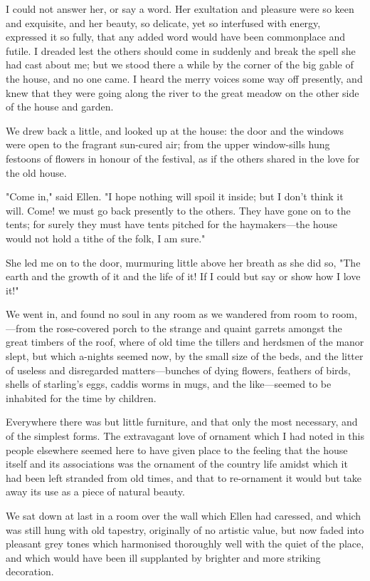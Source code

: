 I could not answer her, or say a word. Her exultation and pleasure were
so keen and exquisite, and her beauty, so delicate, yet so interfused
with energy, expressed it so fully, that any added word would have been
commonplace and futile. I dreaded lest the others should come in
suddenly and break the spell she had cast about me; but we stood there a
while by the corner of the big gable of the house, and no one came. I
heard the merry voices some way off presently, and knew that they were
going along the river to the great meadow on the other side of the house
and garden.

We drew back a little, and looked up at the house: the door and the
windows were open to the fragrant sun-cured air; from the upper
window-sills hung festoons of flowers in honour of the festival, as if
the others shared in the love for the old house.

"Come in," said Ellen. "I hope nothing will spoil it inside; but I don't
think it will. Come! we must go back presently to the others. They have
gone on to the tents; for surely they must have tents pitched for the
haymakers---the house would not hold a tithe of the folk, I am sure."

She led me on to the door, murmuring little above her breath as she did
so, "The earth and the growth of it and the life of it! If I could but
say or show how I love it!"

We went in, and found no soul in any room as we wandered from room to
room,---from the rose-covered porch to the strange and quaint garrets
amongst the great timbers of the roof, where of old time the tillers and
herdsmen of the manor slept, but which a-nights seemed now, by the small
size of the beds, and the litter of useless and disregarded
matters---bunches of dying flowers, feathers of birds, shells of
starling's eggs, caddis worms in mugs, and the like---seemed to be
inhabited for the time by children.

Everywhere there was but little furniture, and that only the most
necessary, and of the simplest forms. The extravagant love of ornament
which I had noted in this people elsewhere seemed here to have given
place to the feeling that the house itself and its associations was the
ornament of the country life amidst which it had been left stranded from
old times, and that to re-ornament it would but take away its use as a
piece of natural beauty.

We sat down at last in a room over the wall which Ellen had caressed,
and which was still hung with old tapestry, originally of no artistic
value, but now faded into pleasant grey tones which harmonised
thoroughly well with the quiet of the place, and which would have been
ill supplanted by brighter and more striking decoration.

